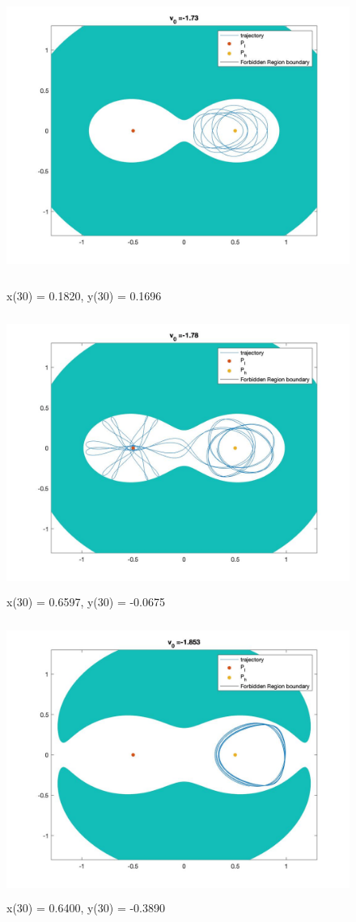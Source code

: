 \documentclass[11pt]{article}
\begin{document}
\begin{figure}[H]
\includegraphics[width = 12cm, height =9cm]{Q3(3).jpg}
\caption{x(30) = 0.1820,  y(30) = 0.1696}
\includegraphics[width = 12cm, height =9cm]{Q3(4).jpg}
\caption{x(30) = 0.6597,  y(30) = -0.0675}
\end{figure}
\begin{figure}[H]
\includegraphics[width = 12cm, height =9cm]{Q3(5).jpg}
\caption{x(30) = 0.6400,  y(30) = -0.3890}
\end{figure}
\end{document}
